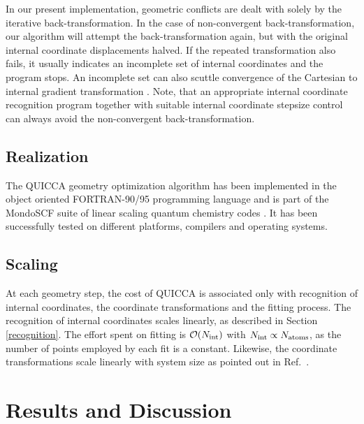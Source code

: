 \documentclass[prl,twocolumn,showpacs,twocolumngrid,superbib]{revtex4}
\begin{document}
In our present implementation, geometric conflicts are dealt with solely by the iterative back-transformation.
In the case of non-convergent back-transformation,  our algorithm will attempt the back-transformation
again, but with the original internal coordinate displacements halved.  If the repeated transformation 
also fails, it usually indicates an incomplete set of internal coordinates and the program stops.  An incomplete 
set can also scuttle convergence of the Cartesian to internal gradient transformation \cite{KNemeth00}. 
Note, that an appropriate internal coordinate recognition program 
together with suitable internal coordinate stepsize control
can always avoid the non-convergent back-transformation.

\subsection{Realization}

The QUICCA geometry optimization algorithm has been implemented in the
object oriented FORTRAN-90/95 programming language and is part of
the MondoSCF suite of linear scaling quantum chemistry codes \cite{MondoSCF}.
It has been successfully tested on different platforms, compilers and operating
systems. 

\subsection{Scaling}

At each geometry step, the cost of QUICCA is associated only with 
recognition of internal coordinates, the coordinate 
transformations and the fitting process. The recognition of internal 
coordinates scales linearly, as described in Section \ref{recognition}.  
The effort spent on fitting is $ {\cal O}(N_{\rm int})$ with $N_{\rm int} \propto N_{\rm atoms}$, as the number of 
points employed by each fit is a constant.  Likewise, the coordinate transformations scale linearly with system 
size as pointed out in Ref.~.


\section{Results and Discussion} \label{Sresults}
\end{document}
